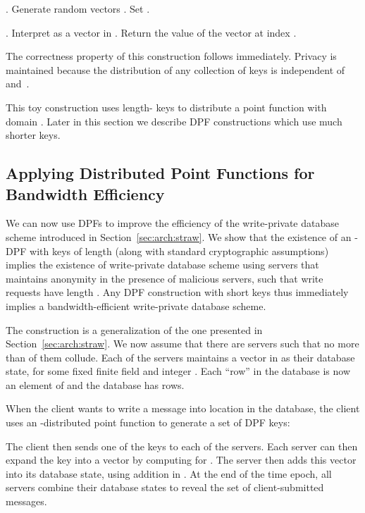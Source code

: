 \documentclass[10pt,twocolumn]{article}
\begin{document}
\begin{compactitem}
\item
.
Generate random vectors .
Set .

\item
.
Interpret  as a vector in .
Return the value of the vector  at index .

\end{compactitem}
The correctness property of this
construction follows immediately.
Privacy is maintained because the distribution of
any collection of  keys is independent of  and~.

This toy construction uses length- keys to distribute
a point function with domain .
Later in this section we describe 
DPF constructions which use much shorter keys.

\subsection{Applying Distributed Point Functions for Bandwidth Efficiency}

We can now use DPFs to improve the efficiency of the
write-private database scheme introduced in Section~\ref{sec:arch:straw}.
We show that the existence of an -DPF with keys of length 
 (along with standard cryptographic assumptions) implies
the existence of write-private database scheme using  servers
that maintains anonymity in the presence of  malicious servers,
such that write requests have length .
Any DPF construction with short keys thus immediately implies 
a bandwidth-efficient write-private database scheme.

The construction is a generalization of the one presented
in Section~\ref{sec:arch:straw}.
We now assume that there are  servers such that no more than 
of them collude.
Each of the  servers maintains a vector in  as their
database state, for some fixed 
finite field  and integer .
Each ``row'' in the database is now an element of  and the database
has  rows.

When the client wants to write a message  into location
 in the database, the client 
uses an -distributed point function to generate a set of
 DPF keys:

The client then sends one of the keys to each of the servers.
Each server  can then expand
the key into a vector 
by computing  for .
The server then adds this vector  into its database state,
using addition in .
At the end of the time epoch, all servers combine their database
states to reveal the set of client-submitted messages.
\end{document}
